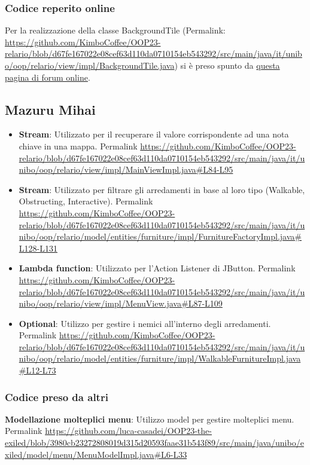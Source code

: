 \documentclass[a4paper,12pt]{report}
\begin{document}
\subsubsection{Codice reperito online}
Per la realizzazione della classe BackgroundTile (Permalink:  \url{https://github.com/KimboCoffee/OOP23-relario/blob/d67fe167022e08cef63d110da0710154eb543292/src/main/java/it/unibo/oop/relario/view/impl/BackgroundTile.java}) si è preso spunto da \href{https://coderanch.com/t/336043/java/Images-top}{questa pagina di forum online}.

\subsection{Mazuru Mihai}
\begin{itemize}
	\item \textbf{Stream}: Utilizzato per il recuperare il valore corrispondente ad una nota chiave in una mappa.
	Permalink \url{https://github.com/KimboCoffee/OOP23-relario/blob/d67fe167022e08cef63d110da0710154eb543292/src/main/java/it/unibo/oop/relario/view/impl/MainViewImpl.java#L84-L95}
    
	\item \textbf{Stream}: Utilizzato per filtrare gli arredamenti in base al loro tipo (Walkable, Obstructing, Interactive).
	Permalink \url{https://github.com/KimboCoffee/OOP23-relario/blob/d67fe167022e08cef63d110da0710154eb543292/src/main/java/it/unibo/oop/relario/model/entities/furniture/impl/FurnitureFactoryImpl.java#L128-L131}

	\item \textbf{Lambda function}: Utilizzato per l’Action Listener di JButton.
	Permalink \url{https://github.com/KimboCoffee/OOP23-relario/blob/d67fe167022e08cef63d110da0710154eb543292/src/main/java/it/unibo/oop/relario/view/impl/MenuView.java#L87-L109}

	\item \textbf{Optional}: Utilizzo per gestire i nemici all'interno degli arredamenti.
	Permalink \url{https://github.com/KimboCoffee/OOP23-relario/blob/d67fe167022e08cef63d110da0710154eb543292/src/main/java/it/unibo/oop/relario/model/entities/furniture/impl/WalkableFurnitureImpl.java#L12-L73}
\end{itemize}

\subsubsection{Codice preso da altri}
\textbf{Modellazione molteplici menu}: Utilizzo model per gestire molteplici menu.
Permalink \url{https://github.com/luca-casadei/OOP23-the-exiled/blob/3980cb23272808019d315d20593faae31b543f89/src/main/java/unibo/exiled/model/menu/MenuModelImpl.java#L6-L33}
\end{document}
